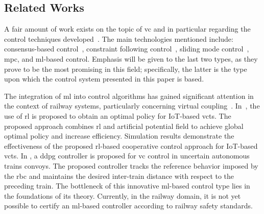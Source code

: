 \documentclass[letterpaper, 10 pt, conference]{ieeeconf}
\theoremstyle{definition}
\theoremstyle{nopoint}
\begin{document}
\subsection{Related Works}
\label{subsec:relatedWorks}

 A fair amount of work exists on the topic of \gls{vc} and in particular regarding the control techniques developed~\cite{wu2023railway}. The main technologies mentioned include: consensus-based control~\cite{wu2023dynamics}, constraint following control~\cite{zhang2023optimal,wang2022constraint}, sliding mode control~\cite{park2022,liu2023method}, \gls{mpc}, and \gls{ml}-based control. Emphasis will be given to the last two types, as they prove to be the most promising in this field; specifically, the latter is the type upon which the control system presented in this paper is based.

The integration of \gls{ml} into control algorithms has gained significant attention in the context of railway systems, particularly concerning virtual coupling~\cite{basile2022roadmap}. In~\cite{wang2021}, the use of \gls{rl} is proposed to obtain an optimal policy for IoT-based \gls{vcts}. The proposed approach combines \gls{rl} and artificial potential field to achieve global optimal policy and increase efficiency. Simulation results demonstrate the effectiveness of the proposed \gls{rl}-based cooperative control approach for IoT-based \gls{vcts}. In \cite{basile2022}, a \gls{ddpg} controller is proposed for \gls{vc} control in uncertain autonomous trains convoys. The proposed controller tracks the reference behavior imposed by the \gls{rbc} and maintains the desired inter-train distance with respect to the preceding train. 
%
The bottleneck of this innovative \gls{ml}-based control type lies in the foundations of its theory. Currently, in the railway domain, it is not yet possible to certify an \gls{ml}-based controller according to railway safety standards.
\end{document}
